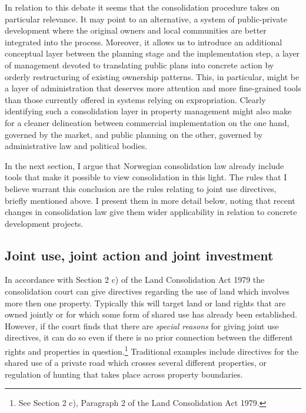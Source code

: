 In relation to this debate it seems that the consolidation procedure takes on particular relevance. It may point to an alternative, a system of public-private development where the original owners and local communities are better integrated into the process. Moreover, it allows us to introduce an additional conceptual layer between the planning stage and the implementation step, a layer of management devoted to translating public plans into concrete action by orderly restructuring of existing ownership patterns. This, in particular, might be a layer of administration that deserves more attention and more fine-grained tools than those currently offered in systems relying on expropriation. Clearly identifying such a consolidation layer in property management might also make for a cleaner delineation between commercial implementation on the one hand, governed by the market, and public planning on the other, governed by administrative law and political bodies. 

In the next section, I argue that Norwegian consolidation law already include tools that make it possible to view consolidation in this light. The rules that I believe warrant this conclusion are the rules relating to joint use directives, briefly mentioned above. I present them in more detail below, noting that recent changes in consolidation law give them wider applicability in relation to concrete development projects. 

\subsection{Joint use, joint action and joint investment}\label{sec:3}

In accordance with Section 2 c) of the Land Consolidation Act 1979 the consolidation court can give directives regarding the use of land which involves more then one property. Typically this will target land or land rights that are owned jointly or for which some form of shared use has already been established. However, if the court finds that there are \emph{special reasons} for giving joint use directives, it can do so even if there is no prior connection between the different rights and properties in question.\footnote{See Section 2 c), Paragraph 2 of the Land Consolidation Act 1979.} Traditional examples include directives for the shared use of a private road which crosses several different properties, or regulation of hunting that takes place across property boundaries.

